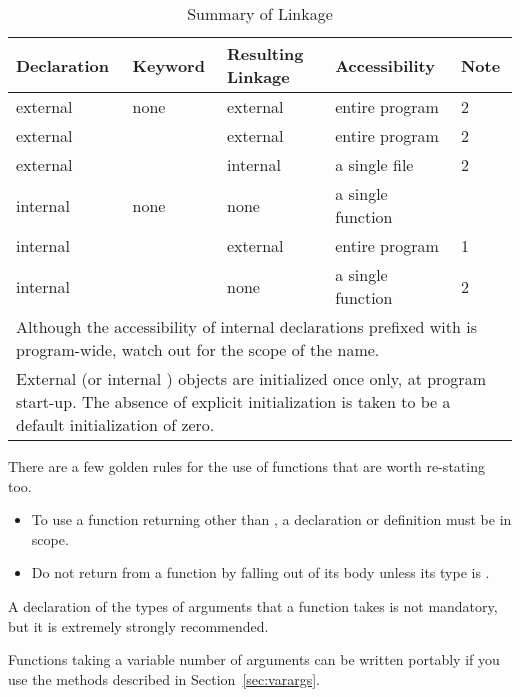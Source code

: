    \begin{table}[htb]
     \centering
     \begin{tabular}{lllll}
       \toprule
       Declaration & Keyword   & Resulting Linkage & Accessibility & Note   \\
       \midrule
       external    & none      & external & entire program    & 2   \\
       external    & \extern{} & external & entire program    & 2   \\
       external    & \static{} & internal & a single file     & 2   \\
       internal    & none      & none     & a single function &    \\
       internal    & \extern{} & external & entire program    & 1   \\
       internal    & \static{} & none     & a single function & 2   \\
       \multicolumn{5}{p{0.9\textwidth}}{
       Although the accessibility of internal declarations prefixed with
       \extern{} is program-wide, watch out for the scope of the name.}\\
       \multicolumn{5}{p{0.9\textwidth}}{
       External (or internal \static{}) objects are initialized
       once only, at program start-up.
       The absence of explicit initialization
       is taken to be a default initialization of zero.}\\
       \bottomrule
     \end{tabular}
     \caption{\label{tab:linkage}Summary of Linkage}
   \end{table}


    
  There are a few golden rules for the use of functions that are worth
   re-stating too.

  \begin{itemize}
   \item To use a function returning other than \kint, a
    declaration or definition must be in scope.
   \item Do not return from a function by falling out of its body unless its
    type is \void.
  \end{itemize}
  A declaration of the types of arguments that a function takes is not
   mandatory, but it is extremely strongly recommended.


  Functions taking a variable number of arguments can be written portably
   if you use the methods described in Section~\ref{sec:varargs}.


